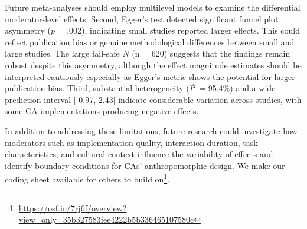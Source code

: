 \documentclass[sigconf,review,anonymous]{acmart}
\begin{document}
Future meta-analyses should employ multilevel models \cite{vandennoortgate2013} to examine the differential moderator-level effects. Second, Egger's test detected significant funnel plot asymmetry ($p$ = .002), indicating small studies reported larger effects. This could reflect publication bias or genuine methodological differences between small and large studies. The large fail-safe $N$ (n = 620) suggests that the findings remain robust despite this asymmetry, although the effect magnitude estimates should be interpreted cautiously especially as Egger's metric shows the potential for larger publication bias. Third, substantial heterogeneity ($I^2$ = 95.4\%) and a wide prediction interval [-0.97, 2.43] indicate considerable variation across studies, with some CA implementations producing negative effects. 

In addition to addressing these limitations, future research could investigate how moderators such as implementation quality, interaction duration, task characteristics, and cultural context influence the variability of effects and identify boundary conditions for CAs' anthropomorphic design. We make our coding sheet available for others to build on\footnote{\href{https://osf.io/7rj6f/overview?view_only=35b327583fee4222b5b336465107580c}{https://osf.io/7rj6f/overview?view\_only=35b327583fee4222b5b336465107580c}}.



\end{document}
